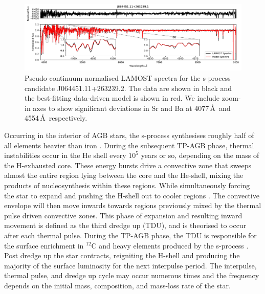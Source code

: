 \documentclass[a4paper,fleqn,usenatbib]{mnras}
\begin{document}
\begin{figure}
	\includegraphics[width=\textwidth]{posterchild_final.pdf}
	\caption{Pseudo-continuum-normalised LAMOST spectra for the s-process candidate J064451.11+263239.2. The data are shown in black and the best-fitting data-driven model is shown in red. We include zoom-in axes to show significant deviations in Sr and Ba at  4077\,\AA\ and 4554\,\AA\, respectively.}
	\label{fig:figure1}
\end{figure}

Occurring in the interior of AGB stars, the s-process synthesises roughly half of all elements heavier than iron \citep[e.g.,][]{busso1999,travaglio2001,herwig2005,bisterzo2014,karakas2014}. During the subsequent TP-AGB phase, thermal instabilities occur in the He shell every $10^5$ years or so, depending on the mass of the H-exhausted core. These energy bursts drive a convective zone that sweeps almost the entire region lying between the core and the He-shell, mixing the products of nucleosynthesis within these regions. While simultaneously forcing the star to expand and pushing the H-shell out to cooler regions \citep{karakas2002}. The convective envelope will then move inwards towards regions previously mixed by the thermal pulse driven convective zones. This phase of expansion and resulting inward movement is defined as the third dredge up (TDU), and is theorised to occur after each thermal pulse. During the TP-AGB phase, the TDU is responsible for the surface enrichment in $^{12}$C and heavy elements produced by the s-process \citep[e.g.,][]{busso2001}. Post dredge up the star contracts, reigniting the H-shell and producing the majority of the surface luminosity for the next interpulse period. The interpulse, thermal pulse, and dredge up cycle may occur numerous times and the frequency depends on the initial mass, composition, and mass-loss rate of the star.
\end{document}
